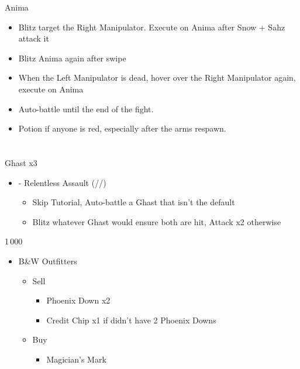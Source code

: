 \documentclass{report}
\begin{document}
\begin{battle}{Anima}
\begin{itemize}
    \item Blitz target the Right Manipulator. Execute on Anima after Snow + Sahz attack it
    \item Blitz Anima again after swipe
    \item When the Left Manipulator is dead, hover over the Right Manipulator again, execute on Anima
    \item Auto-battle until the end of the fight.
    \item Potion if anyone is red, especially after the arms respawn.
\end{itemize}
\end{battle}



\chapter{}

\renewcommand{\first}{[1] - Relentless Assault (\com/\rav/\rav)}

\begin{battle}{Ghast x3}
\begin{itemize}
    \item \first
    \begin{itemize}
        \item Skip Tutorial, Auto-battle a Ghast that isn't the default
        \item Blitz whatever Ghast would ensure both are hit, Attack x2 otherwise
    \end{itemize}
\end{itemize}
\end{battle}

\begin{shop}{1\,000}
\begin{itemize}
    \item B\&W Outfitters
    \begin{itemize}
        \item Sell
        \begin{itemize}
            \item Phoenix Down x2
            \item Credit Chip x1 if didn't have 2 Phoenix Downs
        \end{itemize}
        \item Buy
        \begin{itemize}
            \item Magician's Mark
        \end{itemize}
    \end{itemize}
\end{itemize}
\end{shop}
\end{document}
